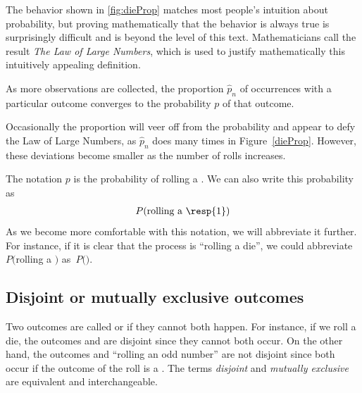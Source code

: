 The behavior shown in \ref{fig:dieProp} matches most people's intuition about probability, but proving mathematically that the behavior is always true is surprisingly difficult and is beyond the level of this text.  Mathematicians call the result \textit{The Law of Large Numbers}, which is used to justify mathematically this intuitively appealing definition.


\begin{termBox}{
As more observations are collected, the proportion $\hat{p}_n$ of occurrences with a particular outcome converges to the probability $p$ of that outcome.}
\end{termBox}

Occasionally the proportion will veer off from the probability and appear to defy the Law of Large Numbers, as $\hat{p}_n$ does many times in Figure~\ref{dieProp}. However, these deviations become smaller as the number of rolls increases.

The notation $p$ is the probability of rolling a . We can also write this probability as
\begin{eqnarray*}
P(\text{rolling a \resp{1}})
\end{eqnarray*}
As we become more comfortable with this notation, we will abbreviate it further. For instance, if it is clear that the process is ``rolling a die'', we could abbreviate $P($rolling a $)$ as~$P($$)$. 

\subsection{Disjoint or mutually exclusive outcomes}


Two outcomes are called  or  if they cannot both happen. For instance, if we roll a die, the outcomes  and  are disjoint since they cannot both occur. On the other hand, the outcomes  and ``rolling an odd number'' are not disjoint since both occur if the outcome of the roll is a . The terms \emph{disjoint} and \emph{mutually exclusive} are equivalent and interchangeable.

